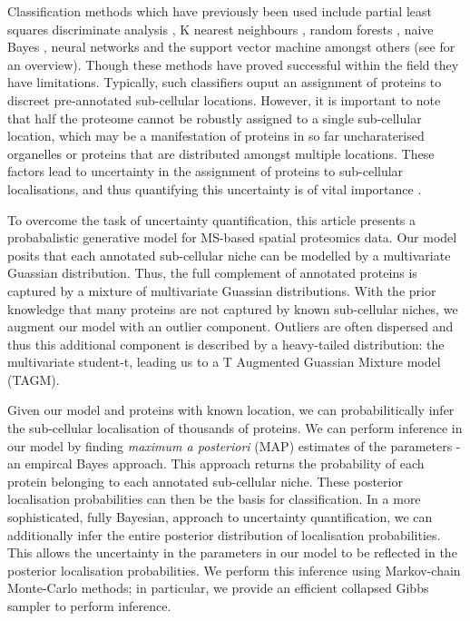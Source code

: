 \documentclass[12pt,english]{article}
\begin{document}
Classification methods which have previously been used include partial least squares
discriminate analysis \citep{Dunkley:2006}, K nearest neighbours \citep{Groen::2014}, random forests \citep{Ohta::2010}, naive Bayes \citep{Nikolovski::2012}, neural networks \citep{Tardif::2012} and
the support vector machine amongst others (see \cite{Gatto:2014b} for an overview). Though these methods have proved successful
within the field they have limitations. Typically, such classifiers ouput an assignment of
proteins to discreet pre-annotated sub-cellular locations. However, it is important to
note that half the proteome cannot be robustly assigned to a single sub-cellular location, which may
be a manifestation of proteins in so far uncharaterised organelles or proteins that are distributed
amongst multiple locations. These factors lead to uncertainty in the assignment of proteins to
sub-cellular localisations, and thus quantifying this uncertainty is of vital importance \citep{Kirk:2015}.

To overcome the task of uncertainty quantification, this article presents a probabalistic generative model for MS-based spatial proteomics data. Our model posits that each annotated sub-cellular niche can be modelled by a multivariate Guassian distribution. Thus, the full complement of annotated proteins is captured by a
mixture of multivariate Guassian distributions. With the prior knowledge that many proteins are not captured
by known sub-cellular niches, we augment our model with an outlier component. Outliers are often dispersed
and thus this additional component is described by a heavy-tailed distribution: the multivariate student-t,
leading us to a T Augmented Guassian Mixture model (TAGM).

Given our model and proteins with known location, we can probabilitically infer the sub-cellular localisation of thousands of proteins. We can perform inference in our model by finding \textit{maximum a posteriori} (MAP) estimates of the parameters - an empircal Bayes approach. This approach returns the probability of each protein belonging to each annotated sub-cellular niche. These posterior localisation probabilities can then be the basis for classification. In a more sophisticated, fully Bayesian, approach to uncertainty quantification, we can additionally infer the entire posterior distribution of
localisation probabilities. This allows the uncertainty in the parameters in our model to be reflected
in the posterior localisation probabilities. We perform this inference using Markov-chain Monte-Carlo methods;
in particular, we provide an efficient collapsed Gibbs sampler to perform inference.
\end{document}
